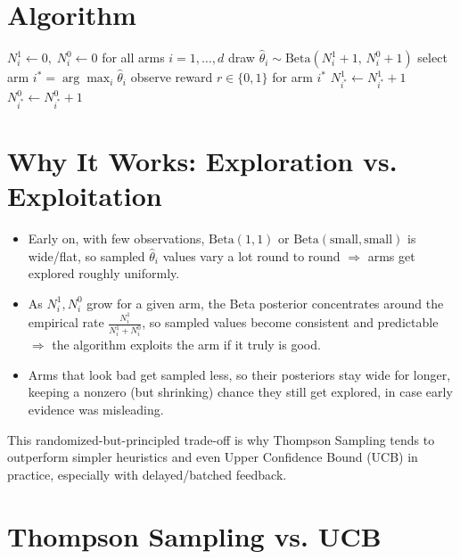 \documentclass[11pt]{article}
\begin{document}
\section{Algorithm}

\begin{algorithm}[h]
\caption{Thompson Sampling for Bernoulli bandits}
\begin{algorithmic}[1]
\State $N_i^1 \gets 0,\; N_i^0 \gets 0$ for all arms $i = 1, \dots, d$
        \State draw $\hat\theta_i \sim \text{Beta}(N_i^1 + 1,\, N_i^0 + 1)$
    \EndFor
    \State select arm $i^\ast = \arg\max_i \hat\theta_i$
    \State observe reward $r \in \{0, 1\}$ for arm $i^\ast$
        \State $N_{i^\ast}^1 \gets N_{i^\ast}^1 + 1$
    \Else
        \State $N_{i^\ast}^0 \gets N_{i^\ast}^0 + 1$
    \EndIf
\EndFor
\end{algorithmic}
\end{algorithm}

\section{Why It Works: Exploration vs. Exploitation}

\begin{itemize}
    \item Early on, with few observations, $\text{Beta}(1,1)$ or
        $\text{Beta}(\text{small}, \text{small})$ is wide/flat, so sampled
        $\hat\theta_i$ values vary a lot round to round $\Rightarrow$ arms get
        explored roughly uniformly.
    \item As $N_i^1, N_i^0$ grow for a given arm, the Beta posterior
        concentrates around the empirical rate
        $\frac{N_i^1}{N_i^1 + N_i^0}$, so sampled values become
        consistent and predictable $\Rightarrow$ the algorithm exploits the
        arm if it truly is good.
    \item Arms that look bad get sampled less, so their posteriors stay
        wide for longer, keeping a nonzero (but shrinking) chance they still
        get explored, in case early evidence was misleading.
\end{itemize}

This randomized-but-principled trade-off is why Thompson Sampling tends to
outperform simpler heuristics and even Upper Confidence Bound (UCB) in
practice, especially with delayed/batched feedback.

\section{Thompson Sampling vs. UCB}
\end{document}
